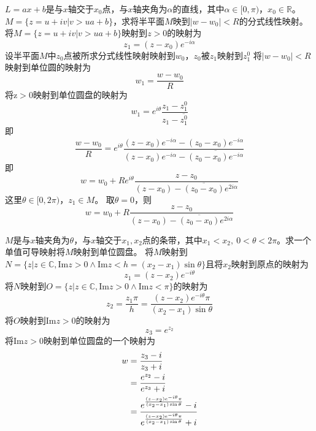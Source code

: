 \begin{homeworkProblem}
$L=ax+b$是与$x$轴交于$x_0$点，与$x$轴夹角为$\alpha$的直线，其中$\alpha\in[0,\pi)$，$x_0\in\mathbb{R}$。$M=\{z=u+iv|v>ua+b\}$，求将半平面$M$映到$|w-w_0|<R$的分式线性映射。\newline
\solution
将$M=\{z=u+iv|v>ua+b\}$映射到$z>0$的映射为
\[
z_1 = (z-x_0)e^{-i\alpha}
\]
设半平面$M$中$z_0$点被所求分式线性映射映射到$w_0$，$z_0$被$z_1$映射到$z_1^0$\newline
将$|w-w_0|<R$映射到单位圆的映射为
\[
w_1 = \frac{w-w_0}{R}
\]
将$\mathrm{z}>0$映射到单位圆盘的映射为
\[
w_1 = e^{i\theta}\frac{z_1 - z_1^0}{z_1-\overline{z_1^0}}
\]
即
\[
\frac{w-w_0}{R} = e^{i\theta}\frac{(z-x_0)e^{-i\alpha} - (z_0-x_0)e^{-i\alpha}}
{(z-x_0)e^{-i\alpha} - \overline{(z_0-x_0)e^{-i\alpha}}}
\]
即
\[
w = w_0 + Re^{i\theta}\frac{z-z_0}{(z-x_0)-\overline{(z_0-x_0)}e^{2i\alpha}}
\]
这里$\theta\in[0,2\pi)$，$z_1\in M$。\newline
取$\theta=0$，则
\[
w = w_0 + R\frac{z-z_0}{(z-x_0)-\overline{(z_0-x_0)}e^{2i\alpha}}
\]
\end{homeworkProblem}

\begin{homeworkProblem}
    $M$是与$x$轴夹角为$\theta$，与$x$轴交于$x_1,x_2$点的条带，其中$x_1 < x_2,~0<\theta<2\pi$。求一个单值可导映射将$M$映射到单位圆盘。\newline
\solution
将$M$映射到$N = \{z|  z\in\mathbb{C},\mathrm{Im}z > 0 \land \mathrm{Im}z < h=(x_2-x_1)\sin\theta \}$且将$x_2$映射到原点的映射为
\[
z_1 = (z-x_2)e^{-i\theta}
\]
将$N$映射到$O = \{z|  z\in\mathbb{C},\mathrm{Im}z > 0 \land \mathrm{Im}z < \pi\}$的映射为
\[
z_2 = \frac{z_1\pi}{h} = \frac{(z-x_2)e^{-i\theta}\pi}{(x_2-x_1)\sin\theta}
\]
将$O$映射到$\mathrm{Im}z>0$的映射为
\[
z_3 = e^{z_2}
\]
将$\mathrm{Im}z>0$映射到单位圆盘的一个映射为
\[\begin{split}
w &= \frac{z_3 - i}{z_3+i}\\
&= \frac{e^{z_2} - i}{e^{z_3} + i} \\
&= \cfrac{e^{\frac{(z-x_2)e^{-i\theta}\pi}{(x_2-x_1)\sin\theta}}-i}{e^{\frac{(z-x_2)e^{-i\theta}\pi}{(x_2-x_1)\sin\theta}}+i}
\end{split}\]
\end{homeworkProblem}

